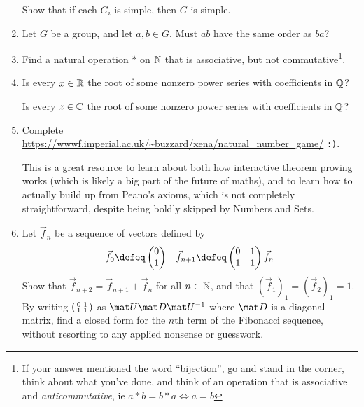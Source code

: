 \documentclass[a4paper,12pt]{article}
\begin{document}
\begin{enumerate}
  Show that if each \(G_i\) is simple, then \(G\) is simple.
 \item
  Let \(G\) be a group, and let \(a, b \in G\). Must \(ab\) have the same order
  as \(ba\)?
 \item
  Find a natural operation \(\ast\) on \(\mathbb N\) that is associative, but not
  commutative\footnote{If your answer mentioned the word ``bijection'', go and
  stand in the corner, think about what you've done, and think of an operation
  that is associative and \emph{anticommutative}, ie
  \(a \ast b = b \ast a \iff a = b\)}.
 \item
  Is every \(x \in \mathbb R\) the root of some nonzero power series with coefficients
  in \(\mathbb Q\)?

  Is every \(z \in \mathbb C\) the root of some nonzero power series with coefficients
  in \(\mathbb Q\)?
 \item
  Complete \url{https://wwwf.imperial.ac.uk/~buzzard/xena/natural_number_game/}
  \texttt{:)}.

  This is a great resource to learn about both how interactive theorem proving
  works (which is likely a big part of the future of maths), and to learn how
  to actually build up from Peano's axioms, which is not completely
  straightforward, despite being boldly skipped by Numbers and Sets.
 \item
  Let \(\vec f_n\) be a sequence of vectors defined by
  \begin{align*}
   \vec f_0 \defeq
    \begin{pmatrix} 0 \\ 1 \end{pmatrix}
   &&
   \vec f_{n + 1} \defeq
    \begin{pmatrix} 0 & 1 \\ 1 & 1 \end{pmatrix}\vec f_n
  \end{align*}
  Show that
  \(\vec f_{n + 2} = \vec f_{n + 1} + \vec f_n\) for all
  \(n \in \mathbb N\), and that \((\vec f_1)_1 = (\vec f_2)_1 = 1\). By
  writing \(\begin{psmallmatrix} 0 & 1 \\ 1 & 1 \end{psmallmatrix}\) as
  \(\mat U \mat D \mat U^{-1}\) where \(\mat D\) is a diagonal matrix,
  find a closed form for the \(n\)th term of the Fibonacci sequence, without
  resorting to any applied nonsense or guesswork.
\end{enumerate}
\end{document}
